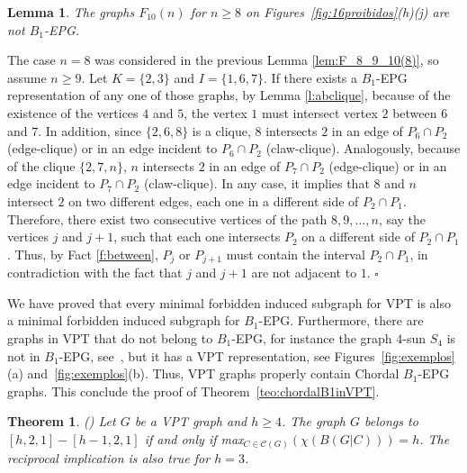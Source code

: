 \documentclass[9pt]{entcs}
\newtheorem{teo}[thm]{Theorem}%
\newtheorem{lema}[thm]{Lemma}%
\newcommand{\la}[1]{\textcolor{blue}{\sf{#1}}}%
\begin{document}
  \begin{lema}\label{lem:F_10(n)}
The graphs  $F_{10}(n)$ for $n \geq 8$ on Figures~\ref{fig:16proibidos}(h)(j) are not   $B_1$-EPG.
\end{lema}
\begin{pf} The case $n=8$ was considered  in the previous Lemma \ref{lem:F_8_9_10(8)}, so assume $n\geq 9$.   Let $K=\{2,3\}$ and $I=\{1,6,7\}$. If there exists a $B_1$-EPG representation of any one of those graphs,  by Lemma \ref{l:abclique},  because of the existence of the vertices  $4$ and $5$, the vertex $1$ must intersect  vertex $2$ between $6$ and $7$. In addition, since $\{2,6,8\}$ is a clique, $8$ intersects $2$ in an edge of $P_6\cap P_2$ (edge-clique) or in an edge incident to $P_6\cap P_2$ (claw-clique). Analogously, because of the clique $\{2,7,n\}$,  $n$ intersects $2$ in an edge of $P_7\cap P_2$ (edge-clique) or in an edge incident to $P_7\cap P_2$ (claw-clique). In any case, it implies that $8$  and $n$ intersect $2$ on two different edges, each one in a different side of $P_2 \cap P_1$. Therefore, there exist two consecutive vertices of the path $8, 9, \ldots, n$, say the vertices $j$ and $j+1$, such that each one intersects $P_2$ on a different side of $P_2 \cap P_1$. Thus, by Fact \ref{f:between}, $P_j$ or $P_{j+1}$ must contain the interval  $P_2 \cap P_1$, in contradiction with the fact that $j$ and $j+1$ are not adjacent to $1$.
  $\square$\end{pf} 

\la{Continuar aqui} 












We have proved that every minimal forbidden induced subgraph for VPT is also a minimal forbidden induced subgraph for $B_1$-EPG. Furthermore, there are graphs in VPT that do not belong to $B_1$-EPG, for instance the graph $4$-sun $S_4$ is not in $B_1$-EPG, see~\cite{golumbic2009}, but it has a VPT representation, see Figures~\ref{fig:exemplos}(a) and~\ref{fig:exemplos}(b). Thus, VPT graphs  properly contain Chordal $B_1$-EPG graphs. This conclude the proof of Theorem~\ref{teo:chordalB1inVPT}.



\begin{teo}
(\cite{alcon2014recognizing}) Let $G$ be a VPT graph and $h\geq 4$. The graph $G$ belongs to $[h,2,1]-[h-1,2,1]$ if and only if max$_{C\in\mathcal{C}(G)}(\chi (B(G|C)))=h$. The reciprocal implication is also true for $h=3$.
\end{teo}
\end{document}

